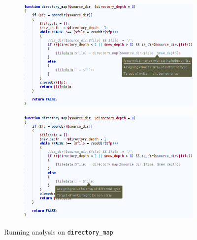 \begin{figure}
\centering
\begin{subfigure}{\textwidth}
\centering
\includegraphics[width=\textwidth]{chapters/caseStudy/newScreens/dirmap1}
\label{fig:directoryScreenshot1}

\end{subfigure}
\begin{subfigure}{\textwidth}
\centering
\includegraphics[width=\textwidth]{chapters/caseStudy/newScreens/dirmap2}
\label{fig:directoryScreenshot2}

\end{subfigure}
\caption{Running analysis on \texttt{directory\_map} }
\label{fig:directoryScreenshot}
\end{figure}


\newpage
